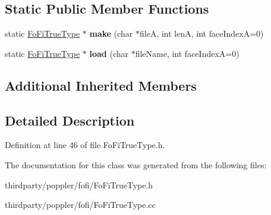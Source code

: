 \subsection*{Static Public Member Functions}
\begin{DoxyCompactItemize}
\item 
\mbox{\label{class_fo_fi_true_type_a8705374984811aabd4d8f5231631101e}} 
static \hyperlink{class_fo_fi_true_type}{Fo\+Fi\+True\+Type} $\ast$ {\bfseries make} (char $\ast$fileA, int lenA, int face\+IndexA=0)
\item 
\mbox{\label{class_fo_fi_true_type_ab82cf9cc30a5eb0fa0da3081fca896ca}} 
static \hyperlink{class_fo_fi_true_type}{Fo\+Fi\+True\+Type} $\ast$ {\bfseries load} (char $\ast$file\+Name, int face\+IndexA=0)
\end{DoxyCompactItemize}
\subsection*{Additional Inherited Members}


\subsection{Detailed Description}


Definition at line 46 of file Fo\+Fi\+True\+Type.\+h.



The documentation for this class was generated from the following files\+:\begin{DoxyCompactItemize}
\item 
thirdparty/poppler/fofi/Fo\+Fi\+True\+Type.\+h\item 
thirdparty/poppler/fofi/Fo\+Fi\+True\+Type.\+cc\end{DoxyCompactItemize}
